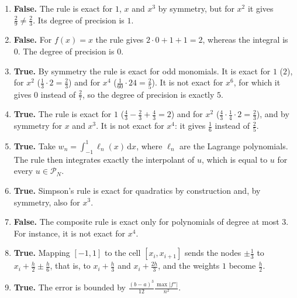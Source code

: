 \documentclass[a4paper]{article}
\renewcommand{\d}{\mathrm d}
\begin{document}
\begin{enumerate}[itemsep=8pt]
    \item \textbf{False.}
        The rule is exact for $1$, $x$ and $x^3$ by symmetry, but for $x^2$ it gives $\frac{2}{9} \neq \frac{2}{3}$.
        Its degree of precision is $1$.

    \item \textbf{False.}
        For $f(x) = x$ the rule gives $2 \cdot 0 + 1 + 1 = 2$, whereas the integral is $0$.
        The degree of precision is $0$.

    \item \textbf{True.}
        By symmetry the rule is exact for odd monomials.
        It is exact for $1$ ($2$), for $x^2$ ($\frac{1}{3} \cdot 2 = \frac{2}{3}$) and for $x^4$ ($\frac{1}{60} \cdot 24 = \frac{2}{5}$).
        It is not exact for $x^6$, for which it gives $0$ instead of $\frac{2}{7}$, so the degree of precision is exactly $5$.

    \item \textbf{True.}
        The rule is exact for $1$ ($\frac{4}{3} - \frac{2}{3} + \frac{4}{3} = 2$) and for $x^2$ ($\frac{4}{3} \cdot \frac{1}{4} \cdot 2 = \frac{2}{3}$),
        and by symmetry for $x$ and $x^3$.
        It is not exact for $x^4$: it gives $\frac{1}{6}$ instead of $\frac{2}{5}$.

    \item \textbf{True.}
        Take $w_n = \int_{-1}^1 \ell_n(x) \, \d x$, where $\ell_n$ are the Lagrange polynomials.
        The rule then integrates exactly the interpolant of $u$, which is equal to $u$ for every $u \in \mathcal P_N$.

    \item \textbf{True.}
        Simpson's rule is exact for quadratics by construction and, by symmetry, also for $x^3$.

    \item \textbf{False.}
        The composite rule is exact only for polynomials of degree at most $3$.
        For instance, it is not exact for $x^4$.

    \item \textbf{True.}
        Mapping $[-1, 1]$ to the cell $[x_i, x_{i+1}]$ sends the nodes $\pm\frac{1}{3}$ to $x_i + \frac{h}{2} \pm \frac{h}{6}$, that is, to $x_i + \frac{h}{3}$ and $x_i + \frac{2h}{3}$,
        and the weights $1$ become $\frac{h}{2}$.

    \item \textbf{True.}
        The error is bounded by $\frac{(b-a)^3}{12} \frac{\max\lvert f''\rvert}{n^2}$.


\end{enumerate}
\end{document}
